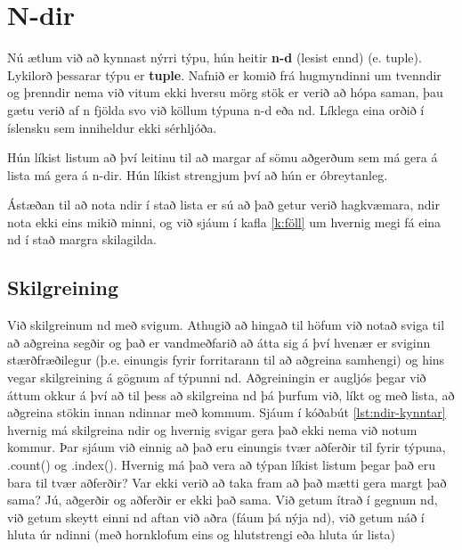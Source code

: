 
\chapter{N-dir}\label{k:ndir}
Nú ætlum við að kynnast nýrri týpu, hún heitir \textbf{n-d} (lesist ennd) (e. tuple).
Lykilorð þessarar týpu er \textbf{tuple}.
Nafnið er komið frá hugmyndinni um tvenndir og þrenndir nema við vitum ekki hversu mörg stök er verið að hópa saman, þau gætu verið af n fjölda svo við köllum týpuna n-d eða nd.
Líklega eina orðið í íslensku sem inniheldur ekki sérhljóða.
 
Hún líkist listum að því leitinu til að margar af sömu aðgerðum sem má gera á lista má gera á n-dir.
Hún líkist strengjum því að hún er óbreytanleg.

Ástæðan til að nota ndir í stað lista er sú að það getur verið hagkvæmara, ndir nota ekki eins mikið minni, og við sjáum í kafla \ref{k:föll} um hvernig megi fá eina nd í stað margra skilagilda. 

\section{Skilgreining}
Við skilgreinum nd með svigum.
Athugið að hingað til höfum við notað sviga til að aðgreina segðir og það er vandmeðfarið að átta sig á því hvenær er sviginn stærðfræðilegur (þ.e. einungis fyrir forritarann til að aðgreina samhengi) og hins vegar skilgreining á gögnum af týpunni nd.
Aðgreiningin er augljós þegar við áttum okkur á því að til þess að skilgreina nd þá þurfum við, líkt og með lista, að aðgreina stökin innan ndinnar með kommum.
Sjáum í kóðabút \ref{lst:ndir-kynntar} hvernig má skilgreina ndir og hvernig svigar gera það ekki nema við notum kommur.
Þar sjáum við einnig að það eru einungis tvær aðferðir til fyrir týpuna, .count() og .index().
Hvernig má það vera að týpan líkist listum þegar það eru bara til tvær aðferðir?
Var ekki verið að taka fram að það mætti gera margt það sama?
Jú, aðgerðir og aðferðir er ekki það sama.
Við getum ítrað í gegnum nd, við getum skeytt einni nd aftan við aðra (fáum þá nýja nd), við getum náð í hluta úr ndinni (með hornklofum eins og hlutstrengi eða hluta úr lista)

